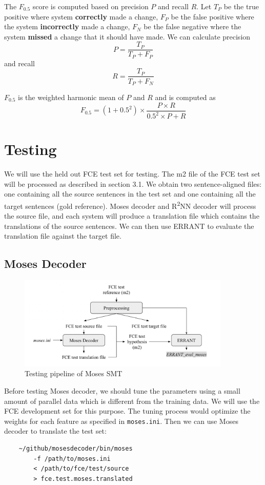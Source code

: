 \documentclass[12pt,a4paper,twoside,openright]{report}
\begin{document}
The $F_{0.5}$ score is computed based on precision $P$ and recall $R$. Let $T_P$ be the true positive where system \textbf{correctly} made a change, $F_P$ be the false positive where the system \textbf{incorrectly} made a change, $F_N$ be the false negative where the system \textbf{missed} a change that it should have made. We can calculate precision
\[P = \frac{T_P}{T_P+F_P}\]
and recall
\[R = \frac{T_P}{T_P+F_N}\]

$F_{0.5}$ is the weighted harmonic mean of $P$ and $R$ and is computed as 
\[F_{0.5}=(1+0.5^2)\times\frac{P\times R}{0.5^2\times P+R}\]

\section{Testing}
We will use the held out FCE test set for testing. The m2 file of the FCE test set will be processed as described in section 3.1. We obtain two sentence-aligned files: one containing all the source sentences in the test set and one containing all the target sentences (gold reference). Moses decoder and R\textsuperscript{2}NN decoder will process the source file, and each system will produce a translation file which contains the translations of the source sentences. We can then use ERRANT to evaluate the translation file against the target file.

\subsection{Moses Decoder}
\begin{figure}[ht]
\centering
\includegraphics[width=0.9\textwidth]{images/moses_test.png}
\caption{Testing pipeline of Moses SMT}
\label{fig:moses_test}
\end{figure}

Before testing Moses decoder, we should tune the parameters using a small amount of parallel data which is different from the training data. We will use the FCE development set for this purpose. The tuning process would optimize the weights for each feature as specified in \texttt{moses.ini}. Then we can use Moses decoder to translate the test set:
\begin{verbatim}
    ~/github/mosesdecoder/bin/moses 
        -f /path/to/moses.ini 
        < /path/to/fce/test/source
        > fce.test.moses.translated
\end{verbatim}
\end{document}
